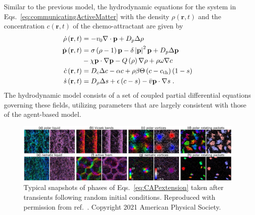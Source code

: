 \documentclass[a4paper, amsfonts, amssymb, amsmath, reprint, showkeys, showpacs, nofootinbib, twoside]{revtex4-2}
\begin{document}
Similar to the previous model, the hydrodynamic equations for the system in Eqs.~\eqref{eq:communicatingActiveMatter} with the density $\rho (\mathbf{r},t)$ and the concentration $c(\mathbf{r},t)$ of the chemo-attractant are given by
\begin{subequations}
    \begin{align}
        \dot{\rho}\left( \mathbf{r},t \right) &=-v_0\nabla \cdot \mathbf{p}+D_p\Delta \rho\\
        \dot{\mathbf{p}}\left( \mathbf{r},t \right) &=\sigma \left( \rho -1 \right) \mathbf{p}-\delta \left| \mathbf{p} \right|^2\mathbf{p}+D_p\Delta \mathbf{p}\notag\\
        &-\chi \mathbf{p}\cdot \nabla \mathbf{p}-Q\left( \rho \right) \nabla \rho +\rho \omega \nabla c\\
        \dot{c}\left( \mathbf{r},t \right) &=D_c\Delta c-\alpha c+\rho \beta \Theta \left( c-c_{\mathrm{th}} \right) \left( 1-s \right)\\
        \dot{s}\left( \mathbf{r},t \right) &=D_{\rho}\Delta s+\epsilon \left( c-s \right) -\bar{v}\mathbf{p}\cdot \nabla s\;.
    \end{align}
\end{subequations}
The hydrodynamic model consists of a set of coupled partial differential equations governing these fields, utilizing parameters that are largely consistent with those of the agent-based model.

\begin{figure}
    \includegraphics[width=\textwidth]{./figs/capBehaviors2.png}
    \caption{
        \label{fig:capBehaviors2} Typical snapshots of phases of Eqs.~\eqref{eq:CAPextension} taken after transients following random initial conditions.
        Reproduced with permission from ref.~\cite{PhysRevLett.127.238001}. Copyright 2021 American Physical Society.
    }
\end{figure}
\end{document}
